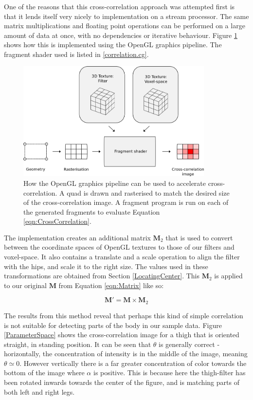 \bigskip
\noindent One of the reasons that this cross-correlation approach was attempted first is that it lends itself very nicely to implementation on a stream processor.
The same matrix multiplications and floating point operations can be performed on a large amount of data at once, with no dependencies or iterative behaviour.
Figure \ref{CrossCorrelation} shows how this is implemented using the OpenGL graphics pipeline.
The fragment shader used is listed in \ref{correlation.cg}.

\begin{figure}[tb]
	\vspace{-10pt}
	\centering
	\includegraphics[height=6cm]{../interim/correlation.png}
	\caption{How the OpenGL graphics pipeline can be used to accelerate cross-correlation.
		A quad is drawn and rasterised to match the desired size of the cross-correlation image.
		A fragment program is run on each of the generated fragments to evaluate Equation \ref{eqn:CrossCorrelation}.}
	\label{CrossCorrelation}
\end{figure}

The implementation creates an additional matrix $\mathbf{M}_2$ that is used to convert between the coordinate spaces of OpenGL textures to those of our filters and voxel-space.
It also contains a translate and a scale operation to align the filter with the hips, and scale it to the right size.
The values used in these transformations are obtained from Section \ref{LocatingCenter}.
This $\mathbf{M}_2$ is applied to our original $\mathbf{M}$ from Equation \ref{eqn:Matrix} like so:

\begin{equation}
	\mathbf{M}' = \mathbf{M} \times \mathbf{M}_2
\end{equation}

\bigskip
\noindent The results from this method reveal that perhaps this kind of simple correlation is not suitable for detecting parts of the body in our sample data.
Figure \ref{ParameterSpace} shows the cross-correlation image for a thigh that is oriented straight, in standing position.
It can be seen that $\theta$ is generally correct - horizontally, the concentration of intensity is in the middle of the image, meaning $\theta \simeq 0$.
However vertically there is a far greater concentration of color towards the bottom of the image where $\alpha$ is positive.
This is because here the thigh-filter has been rotated inwards towards the center of the figure, and is matching parts of both left and right legs.

